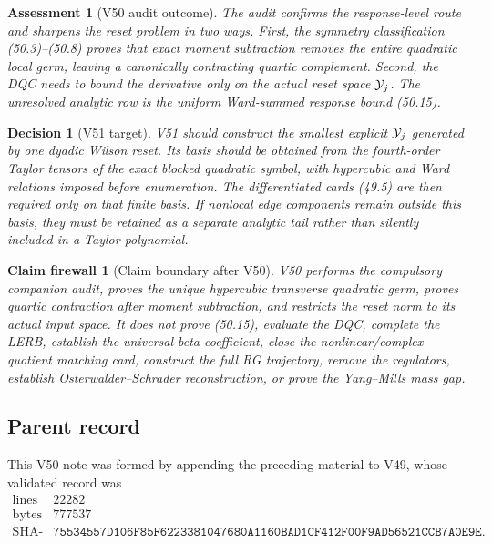 \documentclass[11pt,oneside]{book}
\newtheorem{assessment}[theorem]{Assessment}
\newtheorem{firewall}[theorem]{Claim firewall}
\newtheorem{decision}[theorem]{Decision}
\theoremstyle{definition}
\theoremstyle{remark}
\begin{document}
\begin{assessment}[V50 audit outcome]
\label{ass:e8v50-status}
The audit confirms the response-level route and sharpens the reset
problem in two ways.  First, the symmetry classification
(50.3)--(50.8) proves that exact moment subtraction removes the
entire quadratic local germ, leaving a canonically contracting
quartic complement.  Second, the DQC needs to bound the derivative
only on the actual reset space \({\cal Y}_j\).  The unresolved
analytic row is the uniform Ward-summed response bound (50.15).
\end{assessment}

\begin{decision}[V51 target]
\label{dec:e8v50-next}
V51 should construct the smallest explicit \({\cal Y}_j\) generated
by one dyadic Wilson reset.  Its basis should be obtained from the
fourth-order Taylor tensors of the exact blocked quadratic symbol,
with hypercubic and Ward relations imposed before enumeration.
The differentiated cards (49.5) are then required only on that
finite basis.  If nonlocal edge components remain outside this
basis, they must be retained as a separate analytic tail rather
than silently included in a Taylor polynomial.
\end{decision}

\begin{firewall}[Claim boundary after V50]
\label{fire:e8v50-claim}
V50 performs the compulsory companion audit, proves the unique
hypercubic transverse quadratic germ, proves quartic contraction
after moment subtraction, and restricts the reset norm to its
actual input space.  It does not prove (50.15), evaluate the DQC,
complete the LERB, establish the universal beta coefficient, close
the nonlinear/complex quotient matching card, construct the full
RG trajectory, remove the regulators, establish
Osterwalder--Schrader reconstruction, or prove the Yang--Mills mass
gap.
\end{firewall}

\subsection{Parent record}

This V50 note was formed by appending the preceding material to V49,
whose validated record was
\[
\begin{array}{c|c}
\text{lines}&22282\\
\text{bytes}&777537\\
\text{SHA-256}&
\texttt{75534557D106F85F6223381047680A1160BAD1CF412F00F9AD56521CCB7A0E9E}.
\end{array}
\]
\end{document}
